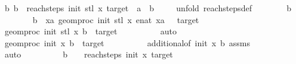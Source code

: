 \begin{isabellebody}
\ {\isachardoublequoteopen}{\isasymAnd}b{\isachardot}{\kern0pt}\ b\ {\isasymin}\ reach{\isacharunderscore}{\kern0pt}steps\ init{\isacharprime}{\kern0pt}\ {\isacharparenleft}{\kern0pt}stl\ x{\isacharparenright}{\kern0pt}\ target\ {\isasymLongrightarrow}\ a{\isacharprime}{\kern0pt}\ {\isasymle}\ b{\isachardoublequoteclose}\isanewline
\ \ \ \ \isamarkupfalse%
{\isacharparenleft}{\kern0pt}unfold\ reach{\isacharunderscore}{\kern0pt}steps{\isacharunderscore}{\kern0pt}def{\isacharparenright}{\kern0pt}\isanewline
\ \ \ \ \ \ \isamarkupfalse%
\ b\isanewline
\ \ \ \ \ \ \isamarkupfalse%
\ {\isachardoublequoteopen}b\ {\isasymin}\ {\isacharbraceleft}{\kern0pt}xa{\isachardot}{\kern0pt}\ geom{\isacharunderscore}{\kern0pt}proc\ init{\isacharprime}{\kern0pt}\ {\isacharparenleft}{\kern0pt}stl\ x{\isacharparenright}{\kern0pt}\ {\isacharparenleft}{\kern0pt}enat\ xa{\isacharparenright}{\kern0pt}\ {\isasymin}\ {\isacharbraceleft}{\kern0pt}{}{\isacharcomma}{\kern0pt}\ target{\isacharbraceright}{\kern0pt}{\isacharbraceright}{\kern0pt}{\isachardoublequoteclose}\isanewline
\ \ \ \ \ \ \isamarkupfalse%
\ \isamarkupfalse%
\ {\isachardoublequoteopen}geom{\isacharunderscore}{\kern0pt}proc\ init{\isacharprime}{\kern0pt}\ {\isacharparenleft}{\kern0pt}stl\ x{\isacharparenright}{\kern0pt}\ b\ {\isasymin}\ {\isacharbraceleft}{\kern0pt}{}{\isacharcomma}{\kern0pt}target{\isacharbraceright}{\kern0pt}{\isachardoublequoteclose}\isanewline
\ \ \ \ \ \ \ \ \isamarkupfalse%
\ auto\isanewline
\ \ \ \ \ \ \isamarkupfalse%
\ \isamarkupfalse%
\ {\isachardoublequoteopen}geom{\isacharunderscore}{\kern0pt}proc\ init\ x\ {\isacharparenleft}{\kern0pt}b{\isacharplus}{\kern0pt}{}{\isacharparenright}{\kern0pt}\ {\isasymin}\ {\isacharbraceleft}{\kern0pt}{}{\isacharcomma}{\kern0pt}target{\isacharbraceright}{\kern0pt}{\isachardoublequoteclose}\isanewline
\ \ \ \ \ \ \ \ \isamarkupfalse%
\ additional{}{\isacharbrackleft}{\kern0pt}of\ init\ x\ b{\isacharbrackright}{\kern0pt}\ assms{\isacharparenleft}{\kern0pt}{}{\isacharparenright}{\kern0pt}\ \isanewline
\ \ \ \ \ \ \ \ \isamarkupfalse%
\ auto\isanewline
\ \ \ \ \ \ \isamarkupfalse%
\ \isamarkupfalse%
\ {\isachardoublequoteopen}{\isacharparenleft}{\kern0pt}b\ {\isacharplus}{\kern0pt}\ {}{\isacharparenright}{\kern0pt}\ {\isasymin}\ reach{\isacharunderscore}{\kern0pt}steps\ init\ x\ target{\isachardoublequoteclose}\isanewline

\end{isabellebody}
